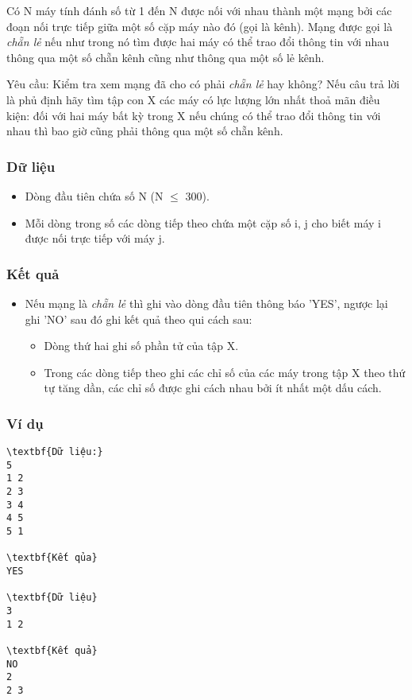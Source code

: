 



   Có N máy tính đánh số từ 1 đến N được nối với nhau thành một mạng bởi các đoạn nối trực tiếp giữa một số cặp máy nào đó (gọi là kênh). Mạng   được gọi là   \emph{    chẵn lẻ   }   nếu như trong nó tìm được hai máy có thể trao đổi thông tin với nhau thông qua một số chẵn kênh cũng như thông qua một   số lẻ kênh.  

   Yêu cầu: Kiểm tra xem mạng đã cho có phải   \emph{    chẵn lẻ   }   hay không? Nếu câu trả lời là phủ định hãy tìm tập con X các máy có lực lượng lớn   nhất thoả mãn điều kiện: đối với hai máy bất kỳ trong X nếu chúng có thể trao đổi thông tin với nhau thì bao giờ cũng phải thông qua một số chẵn kênh.  

\subsubsection{   Dữ liệu  }
\begin{itemize}
	\item     Dòng đầu tiên chứa số N (N $\le$ 300).   
	\item     Mỗi dòng trong số các dòng tiếp theo chứa một cặp số i, j cho biết máy i được nối trực tiếp với máy j.   
\end{itemize}

\subsubsection{   Kết quả  }
\begin{itemize}
	\item     Nếu mạng là    \emph{     chẵn lẻ    }    thì ghi vào dòng đầu tiên thông báo 'YES', ngược lại ghi 'NO' sau đó ghi kết quả theo qui cách sau:    
\begin{itemize}
	\item       Dòng thứ hai ghi số phần tử của tập X.     
	\item       Trong các dòng tiếp theo ghi các chỉ số của các máy trong tập X theo thứ tự tăng dần, các chỉ số được ghi cách nhau bởi ít nhất một dấu cách.     
\end{itemize}
\end{itemize}

\subsubsection{   Ví dụ  }
\begin{verbatim}
\textbf{Dữ liệu:}
5
1 2
2 3
3 4
4 5
5 1

\textbf{Kết qủa}
YES

\textbf{Dữ liệu}
3 
1 2

\textbf{Kết quả}
NO
2
2 3
\end{verbatim}
